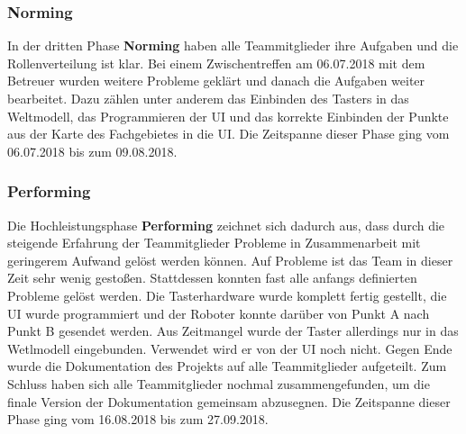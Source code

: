 \documentclass[a4paper,12pt,headsepline]{scrartcl}
\begin{document}
	\subsubsection{Norming}
		In der dritten Phase \textbf{Norming} haben alle Teammitglieder ihre Aufgaben und die Rollenverteilung ist klar. Bei einem Zwischentreffen am 06.07.2018 mit dem Betreuer wurden weitere Probleme geklärt und danach die Aufgaben weiter bearbeitet. Dazu zählen unter anderem das Einbinden des Tasters in das Weltmodell, das Programmieren der UI und das korrekte Einbinden der Punkte aus der Karte des Fachgebietes in die UI. Die Zeitspanne dieser Phase ging vom 06.07.2018 bis zum 09.08.2018.
	\subsubsection{Performing}
		Die Hochleistungsphase \textbf{Performing} zeichnet sich dadurch aus, dass durch die steigende Erfahrung der Teammitglieder Probleme in Zusammenarbeit mit geringerem Aufwand gelöst werden können. Auf Probleme ist das Team in dieser Zeit sehr wenig gestoßen. Stattdessen konnten fast alle anfangs definierten Probleme gelöst werden. Die Tasterhardware wurde komplett fertig gestellt, die UI wurde programmiert und der Roboter konnte darüber von Punkt A nach Punkt B gesendet werden. Aus Zeitmangel wurde der Taster allerdings nur in das Wetlmodell eingebunden. Verwendet wird er von der UI noch nicht. Gegen Ende wurde die Dokumentation des Projekts auf alle Teammitglieder aufgeteilt. Zum Schluss haben sich alle Teammitglieder nochmal zusammengefunden, um die finale Version der Dokumentation gemeinsam abzusegnen. Die Zeitspanne dieser Phase ging vom 16.08.2018 bis zum 27.09.2018.
\end{document}

